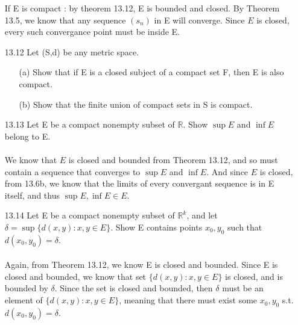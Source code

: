 \begin{itemize}
    If E is compact : by theorem 13.12, E is bounded and closed. By Theorem 13.5, we know that any sequence $(s_n)$ in E will converge. Since $E$ is closed, every such convergance point must be inside E.\\
    
  \item [13.12]
    Let (S,d) be any metric space.
    \begin{itemize}
      \item [(a)] Show that if E is a closed subject of a compact set F, then E is also compact.
      \item [(b)] Show that the finite union of compact sets in S is compact.
    \end{itemize}
  \item [13.13]
    Let E be a compact nonempty subset of $\mathds{R}$. Show $\sup E$ and $\inf E$ belong to E.\\\\
    
    We know that $E$ is closed and bounded from Theorem 13.12, and so must contain a sequence that converges to $\sup E$ and $\inf E$. And since $E$ is closed, from 13.6b, we know that the limits of every convergant sequence is in E itself, and thus $\sup E, \inf E \in E$.\\
  \item [13.14]
    Let E be a compact nonempty subset of $\mathds{R}^k$, and let $\delta = \sup \{d(x,y) : x,y \in E \}$. Show E contains points $x_0, y_0$ such that $d(x_0,y_0) = \delta$.\\\\

    Again, from Theorem 13.12, we know E is closed and bounded. Since E is closed and bounded, we know that set $\{d(x,y) : x,y \in E\}$ is closed, and is bounded by $\delta$. Since the set is closed and bounded, then $\delta$ must be an element of $\{d(x,y) : x,y \in E\}$, meaning that there must exist some $x_0, y_0$ s.t. $d(x_0,y_0) = \delta$.
\end{itemize}


